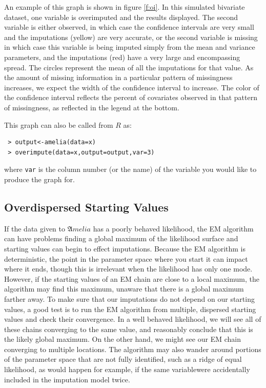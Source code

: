 \documentclass[12pt,titlepage]{article}
\newcommand{\Amelia}{\ensuremath{\mathfrak Amelia} }
\begin{document}
An example of this graph is shown in figure \ref{f:oi}.  In this
simulated bivariate dataset, one variable is overimputed and the
results displayed.  The second variable is either observed, in which
case the confidence intervals are very small and the imputations
(yellow) are very accurate, or the second variable is missing in which
case this variable is being imputed simply from the mean and variance
parameters, and the imputations (red) have a very large and
encompassing spread.  The circles represent the mean of all the
imputations for that value.  As the amount of missing information in a
particular pattern of missingness increases, we expect the width of
the confidence interval to increase.  The color of the confidence
interval reflects the percent of covariates observed in that pattern
of missingness, as reflected in the legend at the bottom.

This graph can also be called from $R$ as:
\begin{verbatim}
 > output<-amelia(data=x) 
 > overimpute(data=x,output=output,var=3)
\end{verbatim}
where \texttt{var} is the column number (or the name) of the variable
you would like to produce the graph for.


\subsection{Overdispersed Starting Values}
\label{sec:overdisperse}

If the data given to \Amelia has a poorly behaved likelihood, the EM
algorithm can have problems finding a global maximum of the likelihood
surface and starting values can begin to effect imputations.  Because
the EM algorithm is deterministic, the point in the parameter space
where you start it can impact where it ends, though this is irrelevant
when the likelihood has only one mode.  However, if the starting
values of an EM chain are close to a local maximum, the algorithm may
find this maximum, unaware that there is a global maximum farther
away.  To make sure that our imputations do not depend on our starting
values, a good test is to run the EM algorithm from multiple,
dispersed starting values and check their convergence.  In a well
behaved likelihood, we will see all of these chains converging to the
same value, and reasonably conclude that this is the likely global
maximum.  On the other hand, we might see our EM chain converging to
multiple locations.  The algorithm may also wander around portions of
the parameter space that are not fully identified, such as a ridge of
equal likelihood, as would happen for example, if the same variablewere
accidentally included in the imputation model twice.
\end{document}
